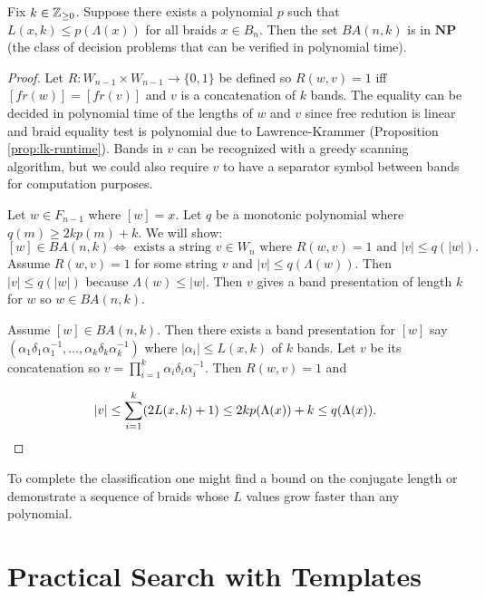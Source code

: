 \documentclass[12pt]{thesis}
\begin{document}
\begin{theorem}
    Fix $k \in \mathbb{Z}_{\geq 0}$.
    Suppose there exists a polynomial $p$ such that 
    $L(x, k) \leq p(\Lambda(x))$ for all braids $x \in B_{n}$.
    Then the set $BA(n, k)$ is in $\textbf{NP}$ (the class of decision problems that can be verified in polynomial time).
\end{theorem}

\begin{proof}
    Let $R \colon W_{n-1} \times W_{n-1} \rightarrow \{ 0, 1\}$ be defined
    so  $R(w, v) = 1$ iff $[fr(w)] = [fr(v)]$ and $v$ is a concatenation of $k$ bands.
    The equality can be decided in polynomial time of the lengths of $w$ and $v$
    since free redution is linear and
    braid equality test is polynomial due to Lawrence-Krammer (Proposition \ref{prop:lk-runtime}).
    Bands in $v$ can be recognized
    with a greedy scanning algorithm, but we could also require $v$ to 
    have a separator symbol between bands for computation purposes.

    Let $w \in F_{n-1}$ where $[w] = x$.
    Let $q$ be a monotonic polynomial where $q(m) \geq 2kp(m) + k$.
    We will show:
    \[
        [w] \in BA(n, k) \Leftrightarrow \text{ exists a string $v \in W_{n}$ where $R(w, v) = 1$ and $|v| \leq q(|w|)$}.
    \]
    Assume $R(w, v) = 1$ for some string $v$ and $|v| \leq q(\Lambda(w))$.
    Then $|v| \leq q(|w|)$ because $\Lambda(w) \leq |w|$.
    Then $v$ gives a band presentation of length $k$ for $w$ so $w \in BA(n, k)$. 

    \begin{sloppypar}
    Assume $[w] \in BA(n, k)$.
    Then there exists a band presentation for $[w]$
    say
     $(\alpha_{1} \delta_{1} \alpha_{1}^{-1},
    \ldots, \alpha_{k} \delta_{k} \alpha_{k}^{-1})$
    where $|\alpha_{i}| \leq L(x, k)$ of $k$ bands.
    Let $v$ be its concatenation so $v = \prod_{i=1}^{k} \alpha_{i}\delta_{i}\alpha_{i}^{-1}$.
    Then $R(w, v) = 1$ and
    \end{sloppypar}
    \[
        |v| \leq \sum_{i=1}^{k} (2L(x, k) + 1) \leq  2kp(\Lambda(x)) + k \leq q(\Lambda(x)). \qedhere 
    \] 
\end{proof}

To complete the classification one might find a bound on the conjugate length
or demonstrate a sequence of braids
whose $L$ values grow faster than any polynomial.

\chapter{Practical Search with Templates}
\end{document}
